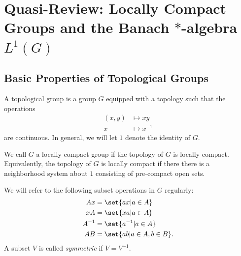 \documentclass[12pt]{mypackage}
\begin{document}
\RaggedRight
\section{Quasi-Review: Locally Compact Groups and the Banach $\ast$-algebra $L^1(G)$}%
\subsection{Basic Properties of Topological Groups}%
A topological group is a group $G$ equipped with a topology such that the operations
\begin{align*}
  \left( x,y \right) &\mapsto xy\\
  x &\mapsto x^{-1}
\end{align*}
are continuous. In general, we will let $1$ denote the identity of $G$.

We call $G$ a locally compact group if the topology of $G$ is locally compact. Equivalently, the topology of $G$ is locally compact if there there is a neighborhood system about $1$ consisting of pre-compact open sets.

We will refer to the following subset operations in $G$ regularly:
\begin{align*}
  Ax &= \set{ax | a\in A}\\
  xA &= \set{xa | a\in A}\\
  A^{-1} &= \set{a^{-1} | a\in A}\\
  AB &= \set{ab | a\in A, b\in B}.
\end{align*}
A subset $V$ is called \textit{symmetric} if $V = V^{-1}$.
\end{document}
